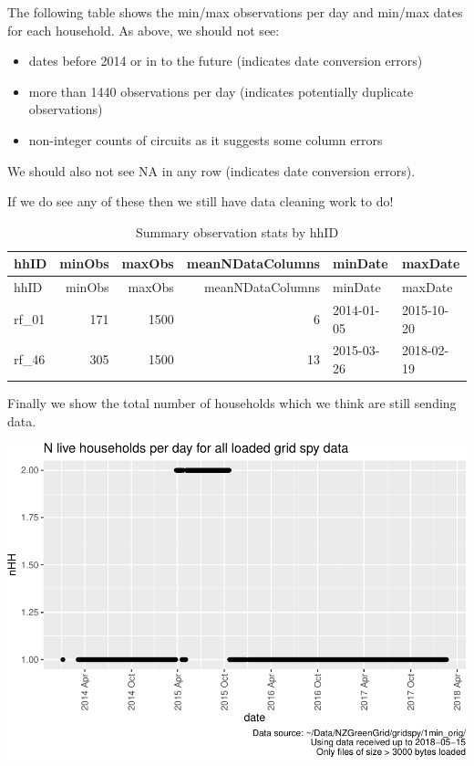 \documentclass[]{article}
\providecommand{\tightlist}{%
  \setlength{\itemsep}{0pt}\setlength{\parskip}{0pt}}
\begin{document}
The following table shows the min/max observations per day and min/max
dates for each household. As above, we should not see:

\begin{itemize}
\tightlist
\item
  dates before 2014 or in to the future (indicates date conversion
  errors)
\item
  more than 1440 observations per day (indicates potentially duplicate
  observations)
\item
  non-integer counts of circuits as it suggests some column errors
\end{itemize}

We should also not see NA in any row (indicates date conversion errors).

If we do see any of these then we still have data cleaning work to do!

\begin{longtable}[]{@{}lrrrll@{}}
\caption{Summary observation stats by hhID}\tabularnewline
\toprule
hhID & minObs & maxObs & meanNDataColumns & minDate &
maxDate\tabularnewline
\midrule
\endfirsthead
\toprule
hhID & minObs & maxObs & meanNDataColumns & minDate &
maxDate\tabularnewline
\midrule
\endhead
rf\_01 & 171 & 1500 & 6 & 2014-01-05 & 2015-10-20\tabularnewline
rf\_46 & 305 & 1500 & 13 & 2015-03-26 & 2018-02-19\tabularnewline
\bottomrule
\end{longtable}

Finally we show the total number of households which we think are still
sending data.

\includegraphics{processNZGGElecCons1minData_v2_files/figure-latex/liveDataHouseholds-1.pdf}
\end{document}
